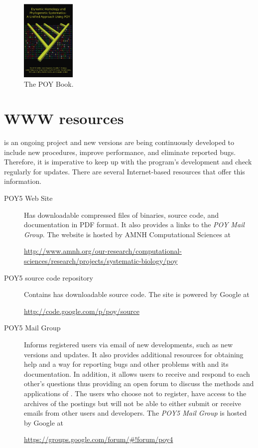 {\begin{description}
\begin{figure}[htbp]
\centering
\includegraphics[width=0.23\textwidth]{doc/figures/figpoybook.jpg}
\caption{The POY Book.}
\label{fig:figprocess}
\end{figure}
\end{description}

\section{WWW resources}
\poy is an ongoing project and new versions are being continuously developed to include new procedures, improve 
performance, and eliminate reported bugs. Therefore, it is imperative to keep up with the program's development and 
check regularly for updates. There are several Internet-based resources that offer this information.

\begin{description}
\item[POY5 Web Site] Has downloadable compressed files of \poy binaries, source code, and documentation in PDF 
format. It also provides a links to the \emph{POY Mail Group}. The website is hosted by AMNH Computational Sciences at 
\begin{center}
\url{http://www.amnh.org/our-research/computational-sciences/research/projects/systematic-biology/poy}
\end{center}

\item[POY5 source code repository] Contains has downloadable \poy source code.  The site is powered by Google at 
\begin{center}
\url{http://code.google.com/p/poy/source}
\end{center}

\item[POY5 Mail Group] Informs registered users via email of new developments, such as new versions and updates. 
It also provides  additional resources for obtaining help and a way for reporting bugs and other problems with \poy and 
its documentation. In addition, it allows users to receive and respond to each other's questions thus providing an open 
forum to  discuss the methods and applications of \poy. The users who choose not to register, have access to the archives 
of the postings but will not be able to either submit or receive emails from other users and \poy developers. The 
\emph{POY5 Mail Group} is hosted  by Google at
\begin{center}
\url{https://groups.google.com/forum/#!forum/poy4}  
\end{center}


\end{description}}
